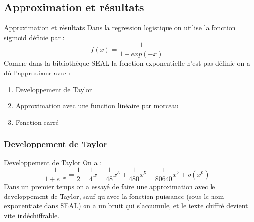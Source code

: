 \documentclass{beamer}
\begin{document}
\subsection{Approximation et résultats}
 \begin{frame}{Approximation et résultats}
 Dans la regression logistique on utilise la fonction sigmoid définie par :\newline
 $$f(x)=\dfrac{1}{1 + exp(-x)}$$
 Comme dans la bibliothèque SEAL la fonction exponentielle n'est pas définie on a dû l'approximer avec :\newline
\begin{enumerate}
	\item{Developpement de Taylor}
	\item{Approximation avec une function linéaire par morceau}
	\item{Fonction carré}
\end{enumerate}
\end{frame}
\subsubsection{Developpement de Taylor}
\begin{frame}{Developpement de Taylor}
On a :
\newcommand\omicron{o}
 $$\dfrac{1}{1+e^{-x}} = \dfrac{1}{2} + \dfrac{1}{4}x - \dfrac{1}{48}x^3 + \dfrac{1}{480}x^5 - \dfrac{1}{80640}x^7 + \omicron(x^9)$$
Dans un premier temps on a essayé de faire une approximation avec le developpement de Taylor, sauf qu'avec la fonction puissance (sous le nom exponentiate dans SEAL) on a un bruit qui s'accumule, et le texte chiffré devient vite indéchiffrable. 
\end{frame}
\end{document}
